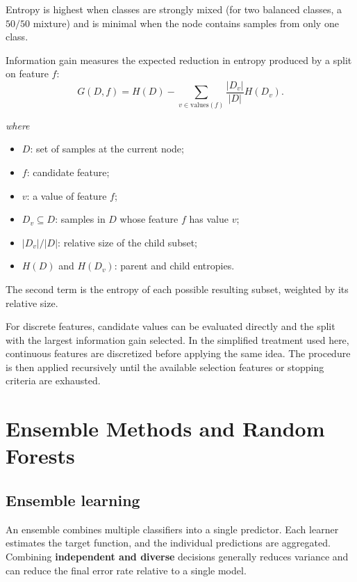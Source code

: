 \documentclass[11pt,a4paper]{report}
\newcommand{\wherelegend}{\par\smallskip\textit{where}\vspace{-0.3em}}
\begin{document}
Entropy is highest when classes are strongly mixed (for two balanced classes, a $50/50$ mixture) and is minimal when the node contains samples from only one class.

\begin{metricbox}[title={Information Gain}]
Information gain measures the expected reduction in entropy produced by a split on feature $f$:
\begin{equation}
  G(D,f)=H(D)-\sum_{v\in\mathrm{values}(f)}\frac{|D_v|}{|D|}H(D_v).
  \label{eq:information-gain}
\end{equation}
\wherelegend
\begin{itemize}
  \item $D$: set of samples at the current node;
  \item $f$: candidate feature;
  \item $v$: a value of feature $f$;
  \item $D_v\subseteq D$: samples in $D$ whose feature $f$ has value $v$;
  \item $|D_v|/|D|$: relative size of the child subset;
  \item $H(D)$ and $H(D_v)$: parent and child entropies.
\end{itemize}
The second term is the entropy of each possible resulting subset, weighted by its relative size.
\end{metricbox}

For discrete features, candidate values can be evaluated directly and the split with the largest information gain selected. In the simplified treatment used here, continuous features are discretized before applying the same idea. The procedure is then applied recursively until the available selection features or stopping criteria are exhausted.

\section{Ensemble Methods and Random Forests}

\subsection{Ensemble learning}

An ensemble combines multiple classifiers into a single predictor. Each learner estimates the target function, and the individual predictions are aggregated. Combining \textbf{independent and diverse} decisions generally reduces variance and can reduce the final error rate relative to a single model.
\end{document}
